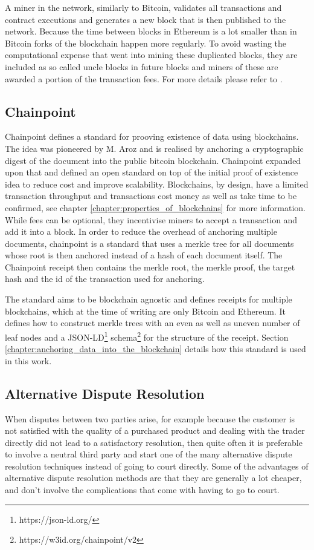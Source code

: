 \documentclass[12pt,msc,a4paper,oneside]{ucl_thesis}
\begin{document}
A miner in the network, similarly to Bitcoin, validates all transactions and contract executions and generates a new block that is then published to the network. Because the time between blocks in Ethereum is a lot smaller than in Bitcoin forks of the blockchain happen more regularly. To avoid wasting the computational expense that went into mining these duplicated blocks, they are included as so called uncle blocks in future blocks and miners of these are awarded a portion of the transaction fees. For more details please refer to \cite{ethereum:gavin_wood}.

\subsection{Chainpoint} \label{sec:literature_chainpoint}
Chainpoint defines a standard for prooving existence of data using blockchains. The idea was pioneered by M. Aroz \cite{proof_of_existence} and is realised by anchoring a cryptographic digest of the document into the public bitcoin blockchain. Chainpoint expanded upon that and defined an open standard on top of the initial proof of existence idea to reduce cost and improve scalability.
Blockchains, by design, have a limited transaction throughput and transactions cost money as well as take time to be confirmed, see chapter \ref{chapter:properties_of_blockchains} for more information. While fees can be optional, they incentivise miners to accept a transaction and add it into a block. In order to reduce the overhead of anchoring multiple documents, chainpoint is a standard that uses a merkle tree for all documents whose root is then anchored instead of a hash of each document itself. The Chainpoint receipt then contains the merkle root, the merkle proof, the target hash and the id of the transaction used for anchoring.

The standard aims to be blockchain agnostic and defines receipts for multiple blockchains, which at the time of writing are only Bitcoin and Ethereum. It defines how to construct merkle trees with an even as well as uneven number of leaf nodes and a JSON-LD\footnote{https://json-ld.org/} schema\footnote{https://w3id.org/chainpoint/v2} for the structure of the receipt. Section \ref{chapter:anchoring_data_into_the_blockchain} details how this standard is used in this work.

\subsection{Alternative Dispute Resolution}
When disputes between two parties arise, for example because the customer is not satisfied with the quality of a purchased product and dealing with the trader directly did not lead to a satisfactory resolution, then quite often it is preferable to involve a neutral third party and start one of the many alternative dispute resolution techniques instead of going to court directly. Some of the advantages of alternative dispute resolution methods are that they are generally a lot cheaper, and don't involve the complications that come with having to go to court. \cite{adr_overview:findlaw}
\end{document}
